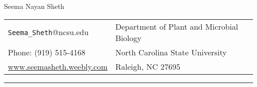 \documentclass[11pt,english]{article}\usepackage[]{graphicx}\usepackage[]{color}
\providecommand{\tabularnewline}{\\}
\begin{document}
\begin {center}


{\huge Seema Nayan Sheth}\tabularnewline
\vspace{1em}

\begin{tabularx}{\textwidth}{@{}>{\raggedright}X >{\raggedleft}X@{}}
\texttt{Seema\_Sheth}@ncsu.edu & Department of Plant and Microbial Biology \tabularnewline
Phone: (919) 515-4168 & North Carolina State University\tabularnewline
\url{www.seemasheth.weebly.com} & Raleigh, NC 27695\tabularnewline
\end{tabularx}
\end{center}
\vspace{-1em}

\rule[0.5ex]{1\linewidth}{0.5pt} 

\end{document}
